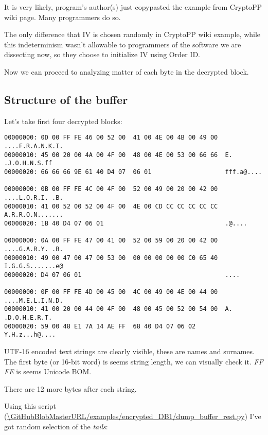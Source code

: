It is very likely, program's author(s) just copypasted the example from CryptoPP wiki page.
Many programmers do so.

The only difference that \ac{IV} is chosen randomly in CryptoPP wiki example, while this indeterminism
wasn't allowable to programmers of the software we are dissecting now,
so they choose to initialize \ac{IV} using Order ID.

Now we can proceed to analyzing matter of each byte in the decrypted block.

\subsection{Structure of the buffer}

Let's take first four decrypted blocks:

\begin{lstlisting}
00000000: 0D 00 FF FE 46 00 52 00  41 00 4E 00 4B 00 49 00  ....F.R.A.N.K.I.
00000010: 45 00 20 00 4A 00 4F 00  48 00 4E 00 53 00 66 66  E. .J.O.H.N.S.ff
00000020: 66 66 66 9E 61 40 D4 07  06 01                    fff.a@....

00000000: 0B 00 FF FE 4C 00 4F 00  52 00 49 00 20 00 42 00  ....L.O.R.I. .B.
00000010: 41 00 52 00 52 00 4F 00  4E 00 CD CC CC CC CC CC  A.R.R.O.N.......
00000020: 1B 40 D4 07 06 01                                 .@....

00000000: 0A 00 FF FE 47 00 41 00  52 00 59 00 20 00 42 00  ....G.A.R.Y. .B.
00000010: 49 00 47 00 47 00 53 00  00 00 00 00 00 C0 65 40  I.G.G.S.......e@
00000020: D4 07 06 01                                       ....

00000000: 0F 00 FF FE 4D 00 45 00  4C 00 49 00 4E 00 44 00  ....M.E.L.I.N.D.
00000010: 41 00 20 00 44 00 4F 00  48 00 45 00 52 00 54 00  A. .D.O.H.E.R.T.
00000020: 59 00 48 E1 7A 14 AE FF  68 40 D4 07 06 02        Y.H.z...h@....
\end{lstlisting}

UTF-16 encoded text strings are clearly visible, these are names and surnames.
The first byte (or 16-bit word) is seems string length, we can visually check it.
\emph{FF FE} is seems Unicode \ac{BOM}.

There are 12 more bytes after each string.

Using this script
(\url{\GitHubBlobMasterURL/examples/encrypted_DB1/dump_buffer_rest.py})
I've got random selection of the \emph{tails}:



